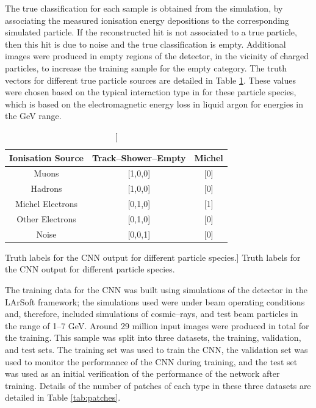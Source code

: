 The true classification for each sample is obtained from the simulation, by 
associating the measured ionisation energy depositions to the corresponding
simulated particle. If the reconstructed hit is not associated to a true
particle, then this hit is due to noise and the true classification is empty.
Additional images were produced in empty regions of the detector, in the 
vicinity of charged particles, to increase the training sample for the empty 
category. The truth vectors for different true particle sources are detailed 
in Table \ref{tab:ground_truth}. These values were chosen based on the typical 
interaction type in \protodune{} for these particle species, which is based on 
the electromagnetic energy loss in liquid argon for energies in the GeV range.
\begin{table}
	\centering
	\bgroup
	\def\arraystretch{1.5}
	\begin{tabular}{c|c|c}
		Ionisation Source & Track--Shower--Empty & Michel \\ \hline
		Muons             & [1,0,0]              & [0]    \\
		Hadrons           & [1,0,0]              & [0]    \\
		Michel Electrons  & [0,1,0]              & [1]    \\
		Other Electrons   & [0,1,0]              & [0]    \\
		Noise             & [0,0,1]              & [0]    \\
	\end{tabular}
	\egroup
	\caption
	[Truth labels for the CNN output for different particle species.]
	{Truth labels for the CNN output for different particle species.}
	\label{tab:ground_truth}
\end{table}

The training data for the CNN was built using simulations of the \protodune{}
detector in the LArSoft framework; the simulations used were under beam
operating conditions and, therefore, included simulations of cosmic--rays, and
test beam particles in the range of 1--7 GeV. Around 29 million input images
were produced in total for the training. This sample was split into three
datasets, the training, validation, and test sets. The training set was used to
train the CNN, the validation set was used to monitor the performance of the CNN
during training, and the test set was used as an initial verification of the 
performance of the network after training. Details of the number of patches of
each type in these three datasets are detailed in Table \ref{tab:patches}.

